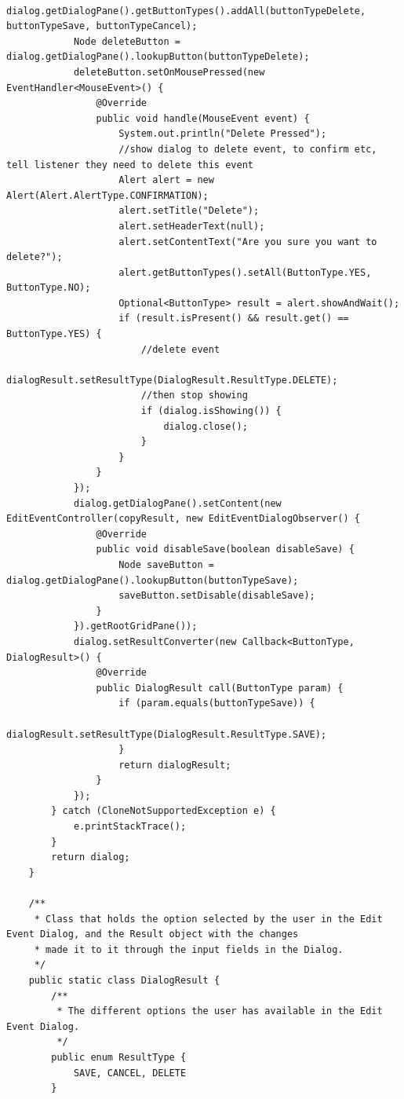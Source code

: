 \begin{lstlisting}
            dialog.getDialogPane().getButtonTypes().addAll(buttonTypeDelete, buttonTypeSave, buttonTypeCancel);
            Node deleteButton = dialog.getDialogPane().lookupButton(buttonTypeDelete);
            deleteButton.setOnMousePressed(new EventHandler<MouseEvent>() {
                @Override
                public void handle(MouseEvent event) {
                    System.out.println("Delete Pressed");
                    //show dialog to delete event, to confirm etc, tell listener they need to delete this event
                    Alert alert = new Alert(Alert.AlertType.CONFIRMATION);
                    alert.setTitle("Delete");
                    alert.setHeaderText(null);
                    alert.setContentText("Are you sure you want to delete?");
                    alert.getButtonTypes().setAll(ButtonType.YES, ButtonType.NO);
                    Optional<ButtonType> result = alert.showAndWait();
                    if (result.isPresent() && result.get() == ButtonType.YES) {
                        //delete event
                        dialogResult.setResultType(DialogResult.ResultType.DELETE);
                        //then stop showing
                        if (dialog.isShowing()) {
                            dialog.close();
                        }
                    }
                }
            });
            dialog.getDialogPane().setContent(new EditEventController(copyResult, new EditEventDialogObserver() {
                @Override
                public void disableSave(boolean disableSave) {
                    Node saveButton = dialog.getDialogPane().lookupButton(buttonTypeSave);
                    saveButton.setDisable(disableSave);
                }
            }).getRootGridPane());
            dialog.setResultConverter(new Callback<ButtonType, DialogResult>() {
                @Override
                public DialogResult call(ButtonType param) {
                    if (param.equals(buttonTypeSave)) {
                        dialogResult.setResultType(DialogResult.ResultType.SAVE);
                    }
                    return dialogResult;
                }
            });
        } catch (CloneNotSupportedException e) {
            e.printStackTrace();
        }
        return dialog;
    }

    /**
     * Class that holds the option selected by the user in the Edit Event Dialog, and the Result object with the changes
     * made it to it through the input fields in the Dialog.
     */
    public static class DialogResult {
        /**
         * The different options the user has available in the Edit Event Dialog.
         */
        public enum ResultType {
            SAVE, CANCEL, DELETE
        }


\end{lstlisting}
